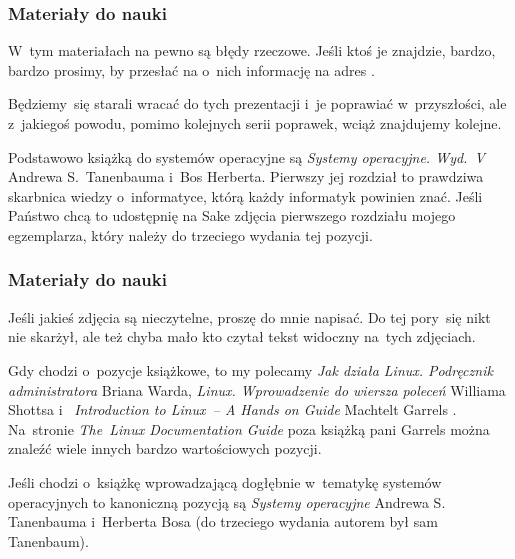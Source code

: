 \documentclass[10pt,t]{beamer}
\begin{document}
\begin{frame}
  \frametitle{Materiały do nauki}


  W~tym materiałach na pewno są błędy rzeczowe. Jeśli ktoś je znajdzie,
  \alert{bardzo, bardzo prosimy}, by przesłać na o~nich informację na adres
  \email.

  Będziemy~się starali wracać do tych prezentacji i~je poprawiać
  w~przyszłości, ale z~jakiegoś powodu, pomimo kolejnych serii poprawek,
  wciąż znajdujemy kolejne.

  Podstawowo książką do systemów operacyjne są
  \textit{Systemy operacyjne. Wyd.~V} Andrewa S.~Tanenbauma i~Bos Herberta.
  Pierwszy jej rozdział to prawdziwa skarbnica wiedzy o~informatyce, którą
  każdy informatyk powinien znać. Jeśli Państwo chcą to udostępnię na Sake
  zdjęcia pierwszego rozdziału mojego egzemplarza, który należy do
  trzeciego wydania tej pozycji.

  \end{frame}





\begin{frame}
  \frametitle{Materiały do nauki}


  Jeśli jakieś zdjęcia są nieczytelne, proszę do mnie napisać. Do tej
  pory~się nikt nie skarżył, ale też chyba mało kto czytał tekst widoczny
  na~tych zdjęciach.

  Gdy chodzi o~pozycje książkowe, to my polecamy
  {\textit{Jak działa Linux. Podręcznik administratora}} Briana Warda,
  {\textit{Linux. Wprowadzenie do wiersza poleceń}} Williama Shottsa
  i~
  {\textit{Introduction to Linux~-- A Hands on Guide}} Machtelt Garrels
  \parencite{Garrels-Introduction-to-Linux-A-Hands-on-Guide-Ver-2008}.
  Na~stronie 
  {\textit{The~Linux Documentation Guide}} poza książką pani Garrels można
  znaleźć wiele innych bardzo wartościowych pozycji.

  Jeśli chodzi o~książkę wprowadzającą dogłębnie w~tematykę systemów
  operacyjnych to kanoniczną pozycją są
  {\textit{Systemy operacyjne}} Andrewa S. Tanenbauma i~Herberta Bosa
  (do trzeciego wydania autorem był sam Tanenbaum).

\end{frame}
\end{document}
